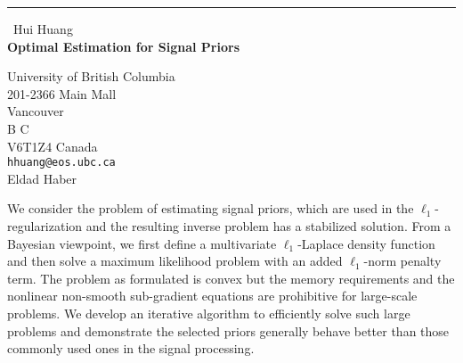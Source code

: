 \documentclass{report}
\begin{document}
\begin{center}
\rule{6in}{1pt} \
{\large Hui Huang \\
{\bf Optimal Estimation for Signal Priors}}

University of British Columbia \\ 201-2366 Main Mall \\ Vancouver \\ B C \\ V6T1Z4 Canada
\\
{\tt hhuang@eos.ubc.ca}\\
Eldad Haber\end{center}

We consider the problem of estimating signal priors, which are used in
the $\ell_1$-regularization and the resulting inverse problem has a
stabilized solution. From a Bayesian viewpoint, we first define a
multivariate $\ell_1$-Laplace density function
and then solve a maximum likelihood problem with an added
$\ell_1$-norm penalty term. The problem as formulated is convex but
the memory requirements and the nonlinear non-smooth sub-gradient
equations are prohibitive for large-scale problems. We develop an
iterative algorithm to efficiently solve such large problems and
demonstrate the selected priors generally behave better than those
commonly used ones in the signal processing.
\end{document}
